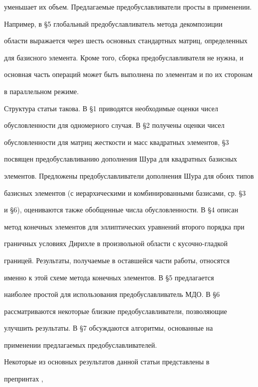 уменьшает их объем. Предлагаемые предобуславливатели просты в применении.


Например, в \S5 глобальный предобуславливатель метода декомпозиции


области выражается через шесть основных стандартных матриц, определенных


для базисного элемента. Кроме того, сборка предобуславливателя не нужна, и


основная часть операций может быть выполнена по элементам и по их сторонам


в параллельном режиме.





Структура статьи такова. В \S1 приводятся необходимые оценки чисел


обусловленности для одномерного случая. В \S2 получены оценки чисел


обусловленности для матриц жесткости и масс квадратных элементов, \S3


посвящен предобуславливанию дополнения Шура для квадратных базисных


элементов. Предложены предобуславливатели дополнения Шура для обоих типов


базисных элементов (с иерархическими и комбинированными базисами, ср. \S3


и \S6), оцениваются также обобщенные числа обусловленности. В \S4 описан


метод конечных элементов для эллиптических уравнений второго порядка при


граничных условиях Дирихле в произвольной области с кусочно-гладкой


границей. Результаты, получаемые в оставшейся части работы, относятся


именно к этой схеме метода конечных элементов. В \S5 предлагается


наиболее простой для использования предобуславливатель МДО. В \S6


рассматриваются некоторые близкие предобуславливатели, позволяющие


улучшить результаты. В \S7 обсуждаются алгоритмы, основанные на


применении предлагаемых предобуславливателей.





Некоторые из основных результатов данной статьи представлены в


препринтах \cite{iva-kor2}, \cite{iva-kor3}


